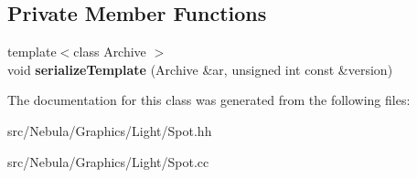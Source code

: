 \subsection*{\-Private \-Member \-Functions}
\begin{DoxyCompactItemize}
\item 
\hypertarget{classNeb_1_1Light_1_1Spot_a893ee6c007425616dc21152411b1adb3}{{\footnotesize template$<$class Archive $>$ }\\void {\bfseries serialize\-Template} (\-Archive \&ar, unsigned int const \&version)}\label{classNeb_1_1Light_1_1Spot_a893ee6c007425616dc21152411b1adb3}

\end{DoxyCompactItemize}


\-The documentation for this class was generated from the following files\-:\begin{DoxyCompactItemize}
\item 
src/\-Nebula/\-Graphics/\-Light/\-Spot.\-hh\item 
src/\-Nebula/\-Graphics/\-Light/\-Spot.\-cc\end{DoxyCompactItemize}
